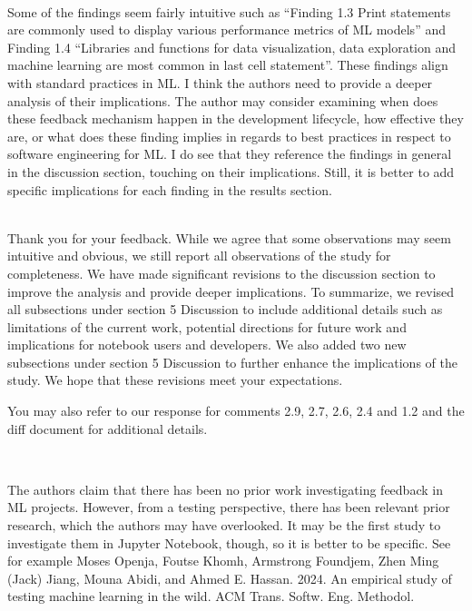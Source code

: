 \documentclass[11pt,fleqn]{article}
\newcommand{\eline}{\vspace*{.75\baselineskip}}
\newcommand{\Referee}[1]{\eline \noindent {\bf Reviewer comment #1:} \\}
\newcommand{\Us}{\eline \noindent {\bf Response:}\\}
\newenvironment{revcomment}[1][]
{\Referee{#1}\begin{rcomment}}
{\end{rcomment}}
\begin{document}
\begin{revcomment}[3.8]
  Some of the findings seem fairly intuitive such as ``Finding 1.3 Print statements are commonly used to display various performance metrics of ML models'' and Finding 1.4 ``Libraries and functions for data visualization, data exploration and machine learning are most common in last cell statement''. These findings align with standard practices in ML. I think the authors need to provide a deeper analysis of their implications. The author may consider examining when does these feedback mechanism happen in the development lifecycle, how effective they are, or what does these finding implies in regards to best practices in respect to software engineering for ML. I do see that they reference the findings in general in the discussion section, touching on their implications. Still, it is better to add specific implications for each finding in the results section.
\end{revcomment}

\Us Thank you for your feedback. While we agree that some observations may seem intuitive and obvious, we still report all observations of the study for completeness. We have made significant revisions to the discussion section to improve the analysis and provide deeper implications. To summarize, we revised all subsections under section 5 Discussion to include additional details such as limitations of the current work, potential directions for future work and implications for notebook users and developers. We also added two new subsections under section 5 Discussion to further enhance the implications of the study. We hope that these revisions meet your expectations.

You may also refer to our response for comments 2.9, 2.7, 2.6, 2.4 and 1.2 and the diff document for additional details.

\begin{revcomment}[3.9]
  The authors claim that there has been no prior work investigating feedback in ML projects. However, from a testing perspective, there has been relevant prior research, which the authors may have overlooked. It may be the first study to investigate them in Jupyter Notebook, though, so it is better to be specific. See for example Moses Openja, Foutse Khomh, Armstrong Foundjem, Zhen Ming (Jack) Jiang, Mouna Abidi, and Ahmed E. Hassan. 2024. An empirical study of testing machine learning in the wild. ACM Trans. Softw. Eng. Methodol.
\end{revcomment}
\end{document}
